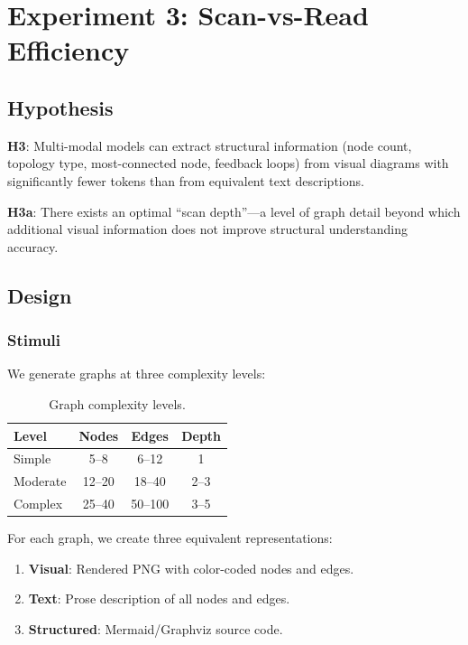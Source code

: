 \documentclass[11pt,a4paper]{article}
\begin{document}
\section{Experiment 3: Scan-vs-Read Efficiency}

\subsection{Hypothesis}

\textbf{H3}: Multi-modal models can extract structural information (node count, topology type, most-connected node, feedback loops) from visual diagrams with significantly fewer tokens than from equivalent text descriptions.

\textbf{H3a}: There exists an optimal ``scan depth''---a level of graph detail beyond which additional visual information does not improve structural understanding accuracy.

\subsection{Design}

\subsubsection{Stimuli}

We generate graphs at three complexity levels:

\begin{table}[h]
\centering
\caption{Graph complexity levels.}
\begin{tabular}{@{}lccc@{}}
\toprule
\textbf{Level} & \textbf{Nodes} & \textbf{Edges} & \textbf{Depth} \\
\midrule
Simple    & 5--8  & 6--12  & 1 \\
Moderate  & 12--20 & 18--40 & 2--3 \\
Complex   & 25--40 & 50--100 & 3--5 \\
\bottomrule
\end{tabular}
\end{table}

For each graph, we create three equivalent representations:
\begin{enumerate}[nosep]
\item \textbf{Visual}: Rendered PNG with color-coded nodes and edges.
\item \textbf{Text}: Prose description of all nodes and edges.
\item \textbf{Structured}: Mermaid/Graphviz source code.
\end{enumerate}
\end{document}
